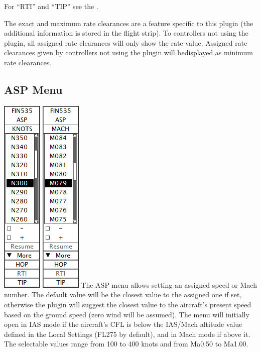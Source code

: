 \documentclass[11pt,a4paper,oldfontcommands]{memoir}
\newenvironment{Warn}
  {\begin{shaded}\marginnote{\fbox{Warning}}}
  {\end{shaded}}
\begin{document}
For “RTI” and “TIP” see the \textit{}.

\begin{Warn}
The exact and maximum rate clearances are a feature specific to this plugin (the additional information is stored in the flight strip). To controllers not using the plugin, all assigned rate clearances will only show the rate value.
Assigned rate clearances given by controllers not using the plugin will bedisplayed as minimum rate clearances.      
\end{Warn}

\subsection{ASP Menu}
\label{menu:asp}
\includegraphics{img/asp.png}
\includegraphics{img/aspmach.png}
The ASP menu allows setting an assigned speed or Mach number. The default value will be the closest value to the assigned one if set, otherwise the plugin will suggest the closest value to the aircraft’s present speed based on the ground speed (zero wind will be assumed). The menu will initially open in IAS mode if the aircraft’s CFL is below the IAS/Mach altitude value defined in the Local Settings (FL275 by default), and in Mach mode if above it. The selectable values range from 100 to 400 knots and from Ma0.50 to Ma1.00.
\end{document}
